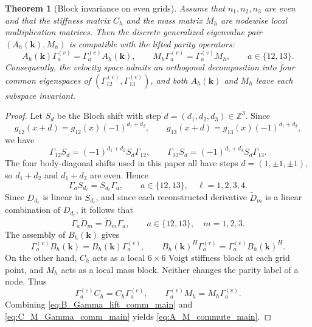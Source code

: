 \documentclass[11pt,oneside]{article}
\numberwithin{equation}{section}
\theoremstyle{plain}
\newtheorem{theorem}{Theorem}[section]
\theoremstyle{remark}
\newcommand{\bk}{\bm{k}}
\begin{document}
\begin{theorem}[Block invariance on even grids]\label{thm:block_invariance}
Assume that \(n_1,n_2,n_3\) are even and that the stiffness matrix \(C_h\) and the mass matrix \(M_h\) are nodewise local multiplication matrices. Then the discrete generalized eigenvalue pair \((A_h(\bk),M_h)\) is compatible with the lifted parity operators:
\begin{equation}\label{eq:A_M_commute_main}
A_h(\bk)\Gamma_a^{(v)}=\Gamma_a^{(v)}A_h(\bk),
\qquad
M_h\Gamma_a^{(v)}=\Gamma_a^{(v)}M_h,
\qquad a\in\{12,13\}.
\end{equation}
Consequently, the velocity space admits an orthogonal decomposition into four common eigenspaces of \((\Gamma_{12}^{(v)},\Gamma_{13}^{(v)})\), and both \(A_h(\bk)\) and \(M_h\) leave each subspace invariant.
\end{theorem}

\begin{proof}
Let \(S_d\) be the Bloch shift with step \(d=(d_1,d_2,d_3)\in\mathbb Z^3\). Since
\[
g_{12}(x+d)=g_{12}(x)(-1)^{d_1+d_2},\qquad
g_{13}(x+d)=g_{13}(x)(-1)^{d_1+d_3},
\]
we have
\begin{equation}\label{eq:Gamma_shift_comm_maintext}
\Gamma_{12}S_d=(-1)^{d_1+d_2}S_d\Gamma_{12},
\qquad
\Gamma_{13}S_d=(-1)^{d_1+d_3}S_d\Gamma_{13}.
\end{equation}
The four body-diagonal shifts used in this paper all have steps \(d=(1,\pm1,\pm1)\), so \(d_1+d_2\) and \(d_1+d_3\) are even. Hence
\[
\Gamma_a S_{d_\ell}=S_{d_\ell}\Gamma_a,
\qquad a\in\{12,13\},\quad \ell=1,2,3,4.
\]
Since \(D_{d_\ell}\) is linear in \(S_{d_\ell}\), and since each reconstructed derivative \(\widetilde D_m\) is a linear combination of \(D_{d_\ell}\), it follows that
\begin{equation}\label{eq:Gamma_Dtilde_comm_main}
\Gamma_a\widetilde D_m=\widetilde D_m\Gamma_a,
\qquad a\in\{12,13\},\quad m=1,2,3.
\end{equation}
The assembly of \(B_h(\bk)\) gives
\begin{equation}\label{eq:B_Gamma_lift_comm_main}
\Gamma_a^{(v)}B_h(\bk)=B_h(\bk)\Gamma_a^{(e)},
\qquad
B_h(\bk)^H\Gamma_a^{(v)}=\Gamma_a^{(e)}B_h(\bk)^H.
\end{equation}
On the other hand, \(C_h\) acts as a local \(6\times6\) Voigt stiffness block at each grid point, and \(M_h\) acts as a local mass block. Neither changes the parity label of a node. Thus
\begin{equation}\label{eq:C_M_Gamma_comm_main}
\Gamma_a^{(e)}C_h=C_h\Gamma_a^{(e)},
\qquad
\Gamma_a^{(v)}M_h=M_h\Gamma_a^{(v)}.
\end{equation}
Combining \eqref{eq:B_Gamma_lift_comm_main} and \eqref{eq:C_M_Gamma_comm_main} yields \eqref{eq:A_M_commute_main}.
\end{proof}
\end{document}
